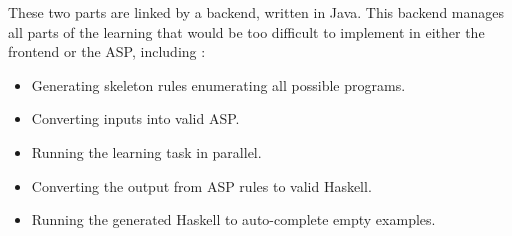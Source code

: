 These two parts are linked by a backend, written in Java. This backend manages all parts of the learning that would be too difficult to implement in either the frontend or the ASP, including :
\begin{itemize}
\item Generating skeleton rules enumerating all possible programs.
\item Converting inputs into valid ASP.
\item Running the learning task in parallel.
\item Converting the output from ASP rules to valid Haskell.
\item Running the generated Haskell to auto-complete empty examples.
\end{itemize}

\pagebreak
%
%
